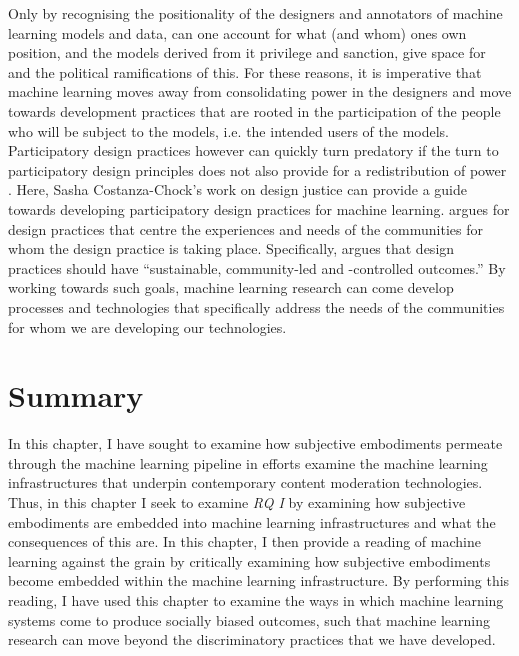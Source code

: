 {Only by recognising the positionality of the designers and annotators of machine learning models and data, can one account for what (and whom) ones own position, and the models derived from it privilege and sanction, give space for and the political ramifications of this.
For these reasons, it is imperative that machine learning moves away from consolidating power in the designers and move towards development practices that are rooted in the participation of the people who will be subject to the models, i.e. the intended users of the models.
Participatory design practices however can quickly turn predatory if the turn to participatory design principles does not also provide for a redistribution of power \citep{Kelly_2019}.
Here, Sasha Costanza-Chock's \citeyearpar{Costanza-Chock_2018} work on design justice can provide a guide towards developing participatory design practices for machine learning.
\citet{Costanza-Chock_2018} argues for design practices that centre the experiences and needs of the communities for whom the design practice is taking place.
Specifically, \citet{Costanza-Chock_2018} argues that design practices should have ``sustainable, community-led and -controlled outcomes.''
By working towards such goals, machine learning research can come develop processes and technologies that specifically address the needs of the communities for whom we are developing our technologies.

\section{Summary}
In this chapter, I have sought to examine how subjective embodiments permeate through the machine learning pipeline in efforts examine the machine learning infrastructures that underpin contemporary content moderation technologies.
Thus, in this chapter I seek to examine \textit{RQ I} by examining how subjective embodiments are embedded into machine learning infrastructures and what the consequences of this are.
In this chapter, I then provide a reading of machine learning against the grain by critically examining how subjective embodiments become embedded within the machine learning infrastructure.
By performing this reading, I have used this chapter to examine the ways in which machine learning systems come to produce socially biased outcomes, such that machine learning research can move beyond the discriminatory practices that we have developed.

}
